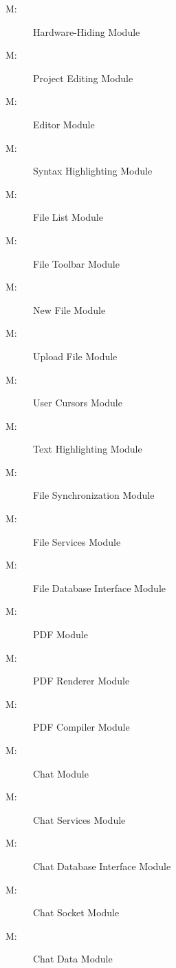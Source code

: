\documentclass[12pt, titlepage]{article}
\newcounter{mnum}
\newcommand{\mthemnum}{M\themnum}
\begin{document}
	
	
	\begin{description}
		\item [ \mthemnum: \label{m1}] Hardware-Hiding Module
		\item [ \mthemnum: \label{m2}] Project Editing Module
		\item [ \mthemnum: \label{m3}] Editor Module
		\item [ \mthemnum: \label{m4}] Syntax Highlighting Module
		\item [ \mthemnum: \label{m6}] File List Module
		\item [ \mthemnum: \label{m7}] File Toolbar Module
		\item [ \mthemnum: \label{m8}] New File Module
		\item [ \mthemnum: \label{m9}] Upload File Module
		\item [ \mthemnum: \label{m10}] User Cursors Module
		\item [ \mthemnum: \label{m11}] Text Highlighting Module
		\item [ \mthemnum: \label{m12}] File Synchronization Module
		\item [ \mthemnum: \label{m13}] File Services Module
		\item [ \mthemnum: \label{m14}] File Database Interface Module
		\item [ \mthemnum: \label{m15}] PDF Module
		\item [ \mthemnum: \label{m16}] PDF Renderer Module
		\item [ \mthemnum: \label{m17}] PDF Compiler Module
		\item [ \mthemnum: \label{m18}] Chat Module
		\item [ \mthemnum: \label{m19}] Chat Services Module
		\item [ \mthemnum: \label{m20}] Chat Database Interface Module
		\item [ \mthemnum: \label{m21}] Chat Socket Module
		\item [ \mthemnum: \label{m22}] Chat Data Module

\end{description}
\end{document}
